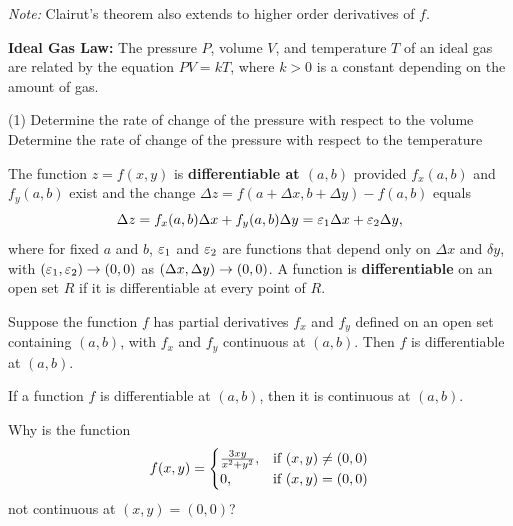 \documentclass[mathNotesPreamble]{subfiles}
\begin{document}
  \vspace*{0.5\baselineskip}\noindent
  \textit{Note:} Clairut's theorem also extends to higher order derivatives of $f$.

  \begin{ex*}
    \textbf{Ideal Gas Law:} The pressure $P$, volume $V$, and temperature $T$ of an ideal gas are related by the equation $PV=kT$, where $k>0$ is a constant depending on the amount of gas.
  \end{ex*}
  \begin{tasks}[after-item-skip=\stretch{1}, label=](1)
    \task Determine the rate of change of the pressure with respect to the volume
    \task Determine the rate of change of the pressure with respect to the temperature
  \end{tasks}
  \pagebreak

  \begin{defn*}[Differentiability]
    The function $z=f(x,y)$ is \textbf{differentiable at $(a,b)$} provided $f_x(a,b)$ and $f_y(a,b)$ exist and the change $\Delta z=f(a+\Delta x, b+\Delta y)-f(a,b)$ equals
      \[\Delta z=f_x(a,b)\Delta x+ f_y(a,b)\Delta y=\varepsilon_1\Delta x+\varepsilon_2\Delta y,\]
    where for fixed $a$ and $b$, $\varepsilon_1$ and $\varepsilon_2$ are functions that depend only on $\Delta x$ and $\delta y$, with ${\left(\varepsilon_1,\varepsilon_2\right)}\to (0,0)$ as ${\left(\Delta x,\Delta y\right)}\to(0,0)$. A function is \textbf{differentiable} on an open set $R$ if it is differentiable at every point of $R$.
  \end{defn*}

  \begin{thmBox*}
    Suppose the function $f$ has partial derivatives $f_x$ and $f_y$ defined on an open set containing $(a,b)$, with $f_x$ and $f_y$ continuous at $(a,b)$. Then $f$ is differentiable at $(a,b)$.
  \end{thmBox*}

  \begin{thmBox*}
    If a function $f$ is differentiable at $(a,b)$, then it is continuous at $(a,b)$.
  \end{thmBox*}
  \begin{ex*}
    Why is the function
      \[f(x,y)=\begin{cases}
        \frac{3xy}{x^2+y^2},& \textnormal{if } (x,y)\neq (0,0)\\
        0,& \textnormal{if } (x,y)=(0,0)
      \end{cases}\]
    not continuous at $(x,y)=(0,0)$?
  \end{ex*}
  \pagebreak
  
\end{document}
